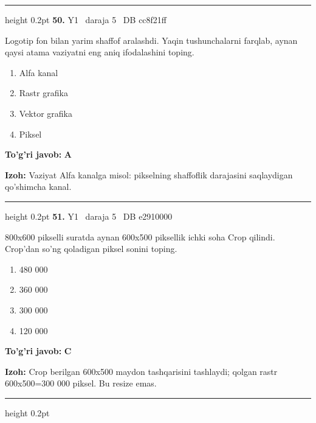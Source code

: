 \documentclass[10pt,a4paper,oneside]{article}
\begin{document}
\vspace{2mm}\hrule height 0.2pt \vspace{4mm}
\hypertarget{q50}{\textbf{\color{ink}50.}}  {\color{muted}\scriptsize Y1 \textbullet\ daraja 5 \textbullet\ DB cc8f21ff}
\par
Logotip fon bilan yarim shaffof aralashdi. Yaqin tushunchalarni farqlab, aynan qaysi atama vaziyatni eng aniq ifodalashini toping.
\begin{enumerate}[label=\Alph*),leftmargin=9mm]
\item Alfa kanal
\item Rastr grafika
\item Vektor grafika
\item Piksel
\end{enumerate}
\begin{tcolorbox}[enhanced,breakable,colback=teal!4,colframe=teal!45!black,boxrule=0.45pt,arc=1.2mm,left=2.8mm,right=2.8mm,top=2mm,bottom=2mm,before skip=2mm,after skip=2mm]
\textbf{\color{teal}To'g'ri javob:} \textbf{A}
\par\smallskip
\textbf{Izoh:} Vaziyat Alfa kanalga misol: pikselning shaffoflik darajasini saqlaydigan qo'shimcha kanal.
\end{tcolorbox}
\vspace{2mm}\hrule height 0.2pt \vspace{4mm}
\hypertarget{q51}{\textbf{\color{ink}51.}}  {\color{muted}\scriptsize Y1 \textbullet\ daraja 5 \textbullet\ DB e2910000}
\par
800x600 pikselli suratda aynan 600x500 piksellik ichki soha Crop qilindi. Crop'dan so'ng qoladigan piksel sonini toping.
\begin{enumerate}[label=\Alph*),leftmargin=9mm]
\item 480 000
\item 360 000
\item 300 000
\item 120 000
\end{enumerate}
\begin{tcolorbox}[enhanced,breakable,colback=teal!4,colframe=teal!45!black,boxrule=0.45pt,arc=1.2mm,left=2.8mm,right=2.8mm,top=2mm,bottom=2mm,before skip=2mm,after skip=2mm]
\textbf{\color{teal}To'g'ri javob:} \textbf{C}
\par\smallskip
\textbf{Izoh:} Crop berilgan 600x500 maydon tashqarisini tashlaydi; qolgan rastr 600x500=300 000 piksel. Bu resize emas.
\end{tcolorbox}
\vspace{2mm}\hrule height 0.2pt \vspace{4mm}
\end{document}
